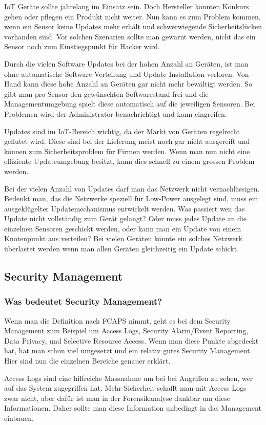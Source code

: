 IoT Geräte sollte jahrelang im Einsatz sein. Doch Hersteller könnten Konkurs gehen oder pflegen ein Produkt nicht weiter. Nun kann es zum Problem kommen, wenn ein Sensor keine Updates mehr erhält und schwerwiegende Sicherheitslücken vorhanden sind. Vor solchen Szenarien sollte man gewarnt werden, nicht das ein Sensor noch zum Einstiegspunkt für Hacker wird.

Durch die vielen Software Updates bei der hohen Anzahl an Geräten, ist man ohne automatische Software Verteilung und Update Installation verloren. Von Hand kann diese hohe Anzahl an Geräten gar nicht mehr bewältigt werden. So gibt man pro Sensor den gewünschten Softwarestand frei und die Managementumgebung spielt diese automatisch auf die jeweiligen Sensoren. Bei Problemen wird der Administrator benachrichtigt und kann eingreifen.

Updates sind im IoT-Bereich wichtig, da der Markt von Geräten regelrecht geflutet wird. Diese sind bei der Lieferung meist noch gar nicht ausgereift und können zum Sicherheitsproblem für Firmen werden. Wenn man nun nicht eine effiziente Updateumgebung besitzt, kann dies schnell zu einem grossen Problem werden.

Bei der vielen Anzahl von Updates darf man das Netzwerk nicht vernachlässigen. Bedenkt man, das die Netzwerke speziell für Low-Power ausgelegt sind, muss ein ausgeklügelter Updatemechanismus entwickelt werden. Was passiert wen das Update nicht vollständig zum Gerät gelangt? Oder muss jedes Update an die einzelnen Sensoren geschickt werden, oder kann man ein Update von einem Knotenpunkt aus verteilen? Bei vielen Geräten könnte ein solches Netzwerk überlastet werden wenn man allen Geräten gleichzeitig ein Update schickt.
\subsection{Security Management}
\subsubsection{Was bedeutet Security Management?}
Wenn man die Definition nach FCAPS nimmt, geht es bei dem Security Management zum Beispiel um Access Logs, Security Alarm/Event Reporting, Data Privacy, und Selective Resource Access. Wenn man diese Punkte abgedeckt hat, hat man schon viel umgesetzt und ein relativ gutes Security Management. Hier sind nun die einzelnen Bereiche genauer erklärt.

Access Logs sind eine hilfreiche Massnahme um bei bei Angriffen zu sehen, wer auf das System zugegriffen hat. Mehr Sicherheit schafft man mit Access Logs zwar nicht, aber dafür ist man in der Forensikanalyse dankbar um diese Informationen. Daher sollte man diese Information unbedingt in das Management einbauen. 

